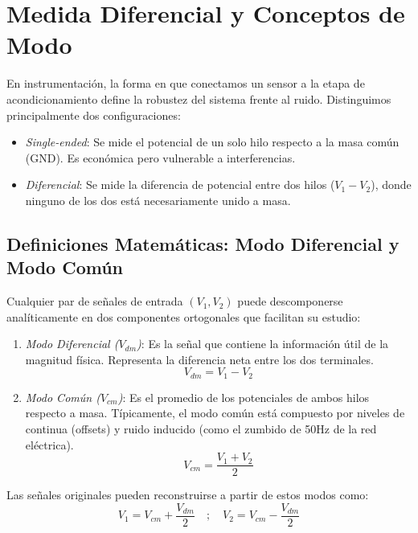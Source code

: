 \section{Medida Diferencial y Conceptos de Modo}\label{sec:medida_diferencial}

En instrumentación, la forma en que conectamos un sensor a la etapa de acondicionamiento define la robustez del sistema frente al ruido. Distinguimos principalmente dos configuraciones:
\begin{itemize}
    \item \emph{Single-ended}: Se mide el potencial de un solo hilo respecto a la masa común (GND). Es económica pero vulnerable a interferencias.
    \item \emph{Diferencial}: Se mide la diferencia de potencial entre dos hilos ($V_1 - V_2$), donde ninguno de los dos está necesariamente unido a masa.
\end{itemize}

\subsection{Definiciones Matemáticas: Modo Diferencial y Modo Común}

Cualquier par de señales de entrada $(V_1, V_2)$ puede descomponerse analíticamente en dos componentes ortogonales que facilitan su estudio:

\begin{enumerate}
    \item \emph{Modo Diferencial ($V_{dm}$)}: Es la señal que contiene la información útil de la magnitud física. Representa la diferencia neta entre los dos terminales.
    \begin{equation}\label{eq:v_dm}
        V_{dm} = V_1 - V_2
    \end{equation}
    
    \item \emph{Modo Común ($V_{cm}$)}: Es el promedio de los potenciales de ambos hilos respecto a masa. Típicamente, el modo común está compuesto por niveles de continua (offsets) y ruido inducido (como el zumbido de \unit{50}{Hz} de la red eléctrica).
    \begin{equation}\label{eq:v_cm}
        V_{cm} = \frac{V_1 + V_2}{2}
    \end{equation}
\end{enumerate}

Las señales originales pueden reconstruirse a partir de estos modos como:
\begin{equation}
    V_1 = V_{cm} + \frac{V_{dm}}{2} \quad ; \quad V_2 = V_{cm} - \frac{V_{dm}}{2}
\end{equation}

